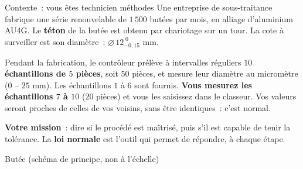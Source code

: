 \documentclass[a4paper,11pt]{article}
\begin{document}
\begin{exo}{Contexte~: vous êtes technicien méthodes}
Une entreprise de sous-traitance fabrique une série renouvelable de $1\,500$ butées par mois, en alliage d'aluminium AU4G. Le \textbf{téton} de la butée est obtenu par chariotage sur un tour. La cote à surveiller est son diamètre~: $\varnothing\,12^{\;0}_{-0{,}15}$ mm.

\smallskip
\begin{minipage}[c]{0.56\linewidth}
Pendant la fabrication, le contrôleur prélève à intervalles réguliers $10$ \textbf{échantillons de $5$ pièces}, soit $50$ pièces, et mesure leur diamètre au micromètre ($0$ -- $25$ mm). Les échantillons $1$ à $6$ sont fournis. \textbf{Vous mesurez les échantillons $7$ à $10$} ($20$ pièces) et vous les saisissez dans le classeur. Vos valeurs seront proches de celles de vos voisins, sans être identiques~: c'est normal.

\smallskip
\textbf{Votre mission}~: dire si le procédé est maîtrisé, puis s'il est capable de tenir la tolérance. La \textbf{loi normale} est l'outil qui permet de répondre, à chaque étape.
\end{minipage}\hfill
\begin{minipage}[c]{0.40\linewidth}\centering
{}

{\scriptsize Butée (schéma de principe, non à l'échelle)}
\end{minipage}
\end{exo}
\end{document}
